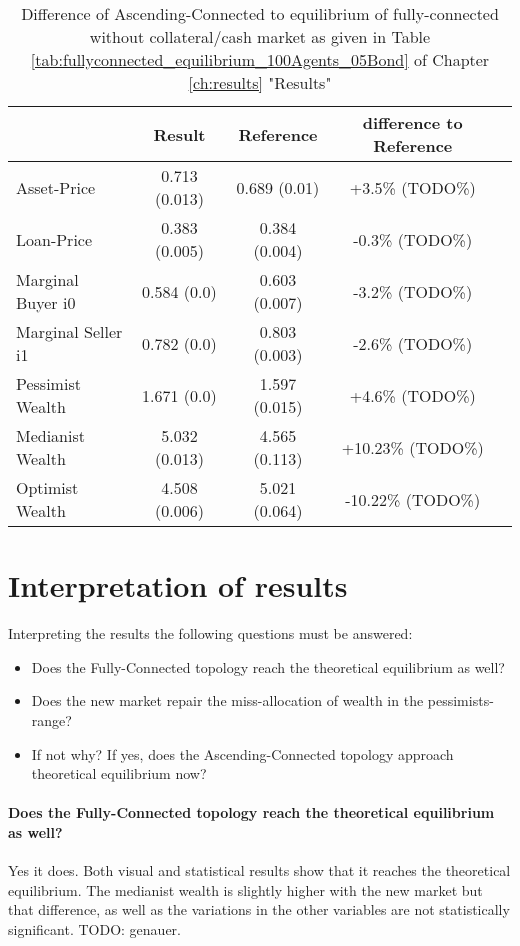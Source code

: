 \documentclass[Bachelorarbeit.tex]{subfiles}
\begin{document}
\begin{table}[H]
	\caption{Difference of Ascending-Connected to equilibrium of fully-connected without collateral/cash market as given in Table \ref{tab:fullyconnected_equilibrium_100Agents_05Bond} of Chapter \ref{ch:results} "Results"}
	\centering
	\begin{tabular} { l c c c r }
		& Result & Reference & difference to Reference \\
		\hline
		Asset-Price & 0.713 (0.013) & 0.689 (0.01) & +3.5\% (TODO\%) \\
		Loan-Price & 0.383 (0.005) & 0.384 (0.004) & -0.3\% (TODO\%) \\
		Marginal Buyer i0 & 0.584 (0.0) & 0.603 (0.007) & -3.2\% (TODO\%) \\
		Marginal Seller i1 & 0.782 (0.0) & 0.803 (0.003) & -2.6\% (TODO\%) \\
		\hline
		Pessimist Wealth & 1.671 (0.0) & 1.597 (0.015) & +4.6\% (TODO\%) \\
		Medianist Wealth & 5.032 (0.013) & 4.565 (0.113) & +10.23\% (TODO\%) \\
		Optimist Wealth & 4.508 (0.006) & 5.021 (0.064) & -10.22\% (TODO\%) \\
		\hline
	\end{tabular}
\end{table} 

\section{Interpretation of results}
Interpreting the results the following questions must be answered:

\begin{itemize}
\item Does the Fully-Connected topology reach the theoretical equilibrium as well?
\item Does the new market repair the miss-allocation of wealth in the pessimists-range?
\item If not why? If yes, does the Ascending-Connected topology approach theoretical equilibrium now?
\end{itemize}

\paragraph{Does the Fully-Connected topology reach the theoretical equilibrium as well?}
Yes it does. Both visual and statistical results show that it reaches the theoretical equilibrium. The medianist wealth is slightly higher with the new market but that difference, as well as the variations in the other variables are not statistically significant. TODO: genauer.
\end{document}
